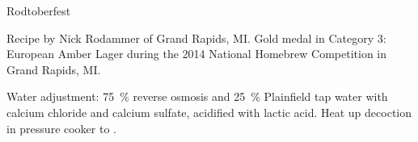 \begin{recipe}{Rodtoberfest} %

\begin{aboutblock}
Recipe by Nick Rodammer of Grand Rapids, MI. Gold medal in Category 3: European
Amber Lager during the 2014 National Homebrew Competition in Grand Rapids, MI.
\sourceaha
\end{aboutblock}


\begin{methodandtiming}

\begin{mashsteps}
\end{mashsteps}

\begin{fermentationsteps}
\end{fermentationsteps}

\begin{directions}
Water adjustment: 75~\% reverse osmosis and 25~\% Plainfield tap water with
 calcium chloride and  calcium sulfate, acidified with 
lactic acid. Heat up decoction in pressure cooker to .
\end{directions}

\end{methodandtiming}

\recipebreak

\begin{ingredientsblock}

\begin{malts}
\end{malts}

\begin{hops}
\end{hops}


\end{ingredientsblock}

\end{recipe}
